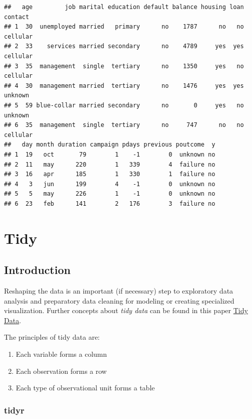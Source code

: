 \documentclass[]{book}
\providecommand{\tightlist}{%
  \setlength{\itemsep}{0pt}\setlength{\parskip}{0pt}}
\begin{document}
\begin{verbatim}
##   age         job marital education default balance housing loan  contact
## 1  30  unemployed married   primary      no    1787      no   no cellular
## 2  33    services married secondary      no    4789     yes  yes cellular
## 3  35  management  single  tertiary      no    1350     yes   no cellular
## 4  30  management married  tertiary      no    1476     yes  yes  unknown
## 5  59 blue-collar married secondary      no       0     yes   no  unknown
## 6  35  management  single  tertiary      no     747      no   no cellular
##   day month duration campaign pdays previous poutcome  y
## 1  19   oct       79        1    -1        0  unknown no
## 2  11   may      220        1   339        4  failure no
## 3  16   apr      185        1   330        1  failure no
## 4   3   jun      199        4    -1        0  unknown no
## 5   5   may      226        1    -1        0  unknown no
## 6  23   feb      141        2   176        3  failure no
\end{verbatim}

\chapter{Tidy}\label{tidy}

\section{\texorpdfstring{\textbf{Introduction}}{Introduction}}\label{introduction-2}

Reshaping the data is an important (if necessary) step to exploratory
data analysis and preparatory data cleaning for modeling or creating
specialized visualization. Further concepts about \emph{tidy data} can
be found in this paper
\href{http://vita.had.co.nz/papers/tidy-data.pdf}{Tidy Data}.

The principles of tidy data are:

\begin{enumerate}
\def\labelenumi{\arabic{enumi}.}
\tightlist
\item
  Each variable forms a column
\item
  Each observation forms a row
\item
  Each type of observational unit forms a table
\end{enumerate}

\subsection{\texorpdfstring{\textbf{tidyr }}{tidyr }}\label{tidyr}
\end{document}
